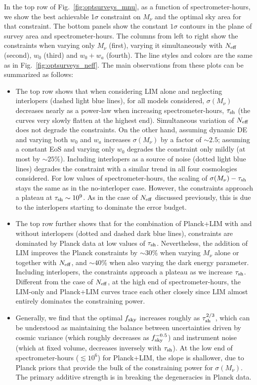 \documentclass[twocolumn]{aastex631}
\begin{document}
In the top row of Fig.~\ref{fig:optsurveys_mnu}, as a function of spectrometer-hours, we show the best achievable 1$\sigma$ constraint on $M_\nu$ and the optimal sky area for that constraint. The bottom panels show the constant $1\sigma$ contours in the plane of survey area and spectrometer-hours. The columns from left to right show the constraints when varying only $M_\nu$ (first), varying it simultaneously with $N_{\rm eff}$ (second), $w_0$ (third) and $w_0+w_a$ (fourth). The line styles and colors are the same as in Fig.~\ref{fig:optsurveys_neff}. The main observations from these plots can be summarized as follows: 
\begin{itemize}[leftmargin=.22in,itemsep=.02in]
    \item The top row shows that when considering LIM alone and neglecting interlopers (dashed light blue lines), for all models considered, $\sigma(M_\nu)$ decreases nearly as a power-law when increasing spectrometer-hours, $\tau_{\rm sh}$ (the curves very slowly flatten at the highest end). Simultaneous variation of $N_{\rm eff}$ does not degrade the constraints. On the other hand, assuming dynamic DE and varying both $w_0$ and $w_a$ increases $\sigma(M_\nu)$ by a factor of $\sim 2.5$; assuming a constant EoS and varying only $w_0$ degrades the constraint only mildly (at most by $\sim 25\%$). Including interlopers as a source of noise (dotted light blue lines) degrades the constraint with a similar trend in all four cosmologies considered. For low values of spectrometer-hours, the scaling of $\sigma(M_\nu) - \tau_{\rm sh}$ stays the same as in the no-interloper case. However, the constraints approach a plateau at $\tau_{\rm sh} \sim 10^9$. As in the case of $N_{\rm eff}$ discussed previously, this is due to the interlopers starting to dominate the error budget. 
    \item The top row further shows that for the combination of Planck+LIM with and without interlopers (dotted and dashed dark blue lines), constraints are dominated by Planck data at low values of $\tau_{\rm sh}$. Nevertheless, the addition of LIM improves the Planck constraints by $\sim30\%$ when varying $M_\nu$ alone or together with $N_{\rm eff}$, and $\sim40\%$ when also varying the dark energy parameter. Including interlopers, the constraints approach a plateau as we increase $\tau_{\rm sh}$. Different from the case of $N_{\rm eff}$, at the high end of spectrometer-hours, the LIM-only and Planck+LIM curves trace each other closely since LIM almost entirely dominates the constraining power.
    \item Generally, we find that the optimal $f_{\rm sky}$ increases roughly as $\tau_{\rm sh}^{2/3}$, which can be understood as maintaining the balance between uncertainties driven by cosmic variance (which roughly decreases as $f_{\rm sky}^{-0.5}$) and instrument noise (which at fixed volume, decreases inversely with $\tau_{\rm sh}$). At the low end of spectrometer-hours ($\lesssim10^{6}$) for Planck+LIM, the slope is shallower, due to Planck priors that provide the bulk of the constraining power for $\sigma(M_{\nu})$. The primary additive strength is in breaking the degeneracies in Planck data.

\end{itemize}
\end{document}
